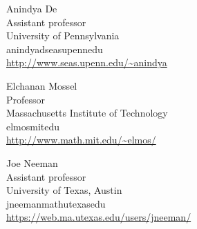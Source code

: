 \documentclass{toc}
\begin{document}
%
%
%
%
%
\begin{tocauthors}
\begin{tocinfo}[de]
 Anindya De\\
 Assistant professor\\
 University of Pennsylvania\\
 anindyad\tocat{}seas\tocdot{}upenn\tocdot{}edu \\   %
 \url{http://www.seas.upenn.edu/~anindya}      %
\end{tocinfo}
\begin{tocinfo}[mossel]
  Elchanan Mossel\\
  Professor\\
  Massachusetts Institute of Technology\\
  elmos\tocat{}mit\tocdot{}edu\\
  \url{http://www.math.mit.edu/~elmos/}
\end{tocinfo}
\begin{tocinfo}[neeman]
  Joe Neeman\\
  Assistant professor\\
  University of Texas, Austin\\
  jneeman\tocat{}math\tocdot{}utexas\tocdot{}edu\\
  \url{https://web.ma.utexas.edu/users/jneeman/}
\end{tocinfo}
\end{tocauthors}
%

%
\end{document}
